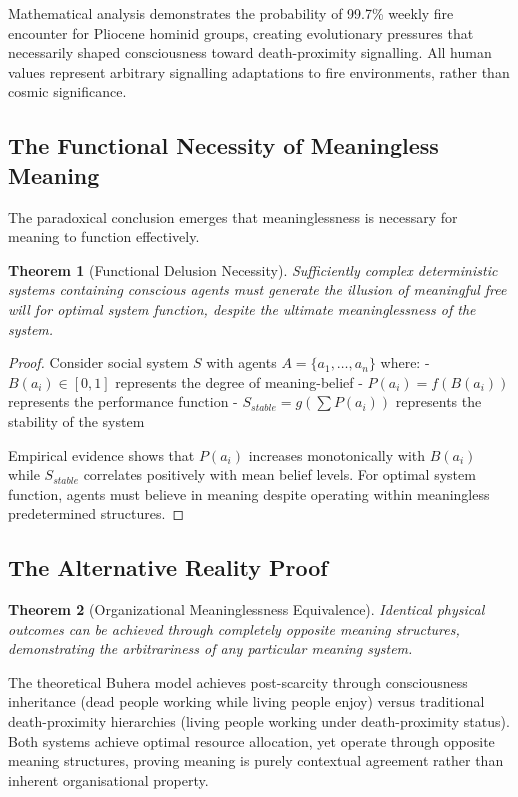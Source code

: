 \documentclass[12pt,a4paper]{article}
\newtheorem{theorem}{Theorem}
\begin{document}
Mathematical analysis demonstrates the probability of 99.7\% weekly fire encounter for Pliocene hominid groups, creating evolutionary pressures that necessarily shaped consciousness toward death-proximity signalling. All human values represent arbitrary signalling adaptations to fire environments, rather than cosmic significance.

\subsection{The Functional Necessity of Meaningless Meaning}

The paradoxical conclusion emerges that meaninglessness is necessary for meaning to function effectively.

\begin{theorem}[Functional Delusion Necessity]
Sufficiently complex deterministic systems containing conscious agents must generate the illusion of meaningful free will for optimal system function, despite the ultimate meaninglessness of the system.
\end{theorem}

\begin{proof}
Consider social system $S$ with agents $A = \{a_1, \ldots, a_n\}$ where:
- $B(a_i) \in [0,1]$ represents the degree of meaning-belief
- $P(a_i) = f(B(a_i))$ represents the performance function  
- $S_{stable} = g(\sum P(a_i))$ represents the stability of the system 

Empirical evidence shows that $P(a_i)$ increases monotonically with $B(a_i)$ while $S_{stable}$ correlates positively with mean belief levels. For optimal system function, agents must believe in meaning despite operating within meaningless predetermined structures.
\end{proof}

\subsection{The Alternative Reality Proof}

\begin{theorem}[Organizational Meaninglessness Equivalence]  
Identical physical outcomes can be achieved through completely opposite meaning structures, demonstrating the arbitrariness of any particular meaning system.
\end{theorem}

The theoretical Buhera model achieves post-scarcity through consciousness inheritance (dead people working while living people enjoy) versus traditional death-proximity hierarchies (living people working under death-proximity status). Both systems achieve optimal resource allocation, yet operate through opposite meaning structures, proving meaning is purely contextual agreement rather than inherent organisational property.
\end{document}
